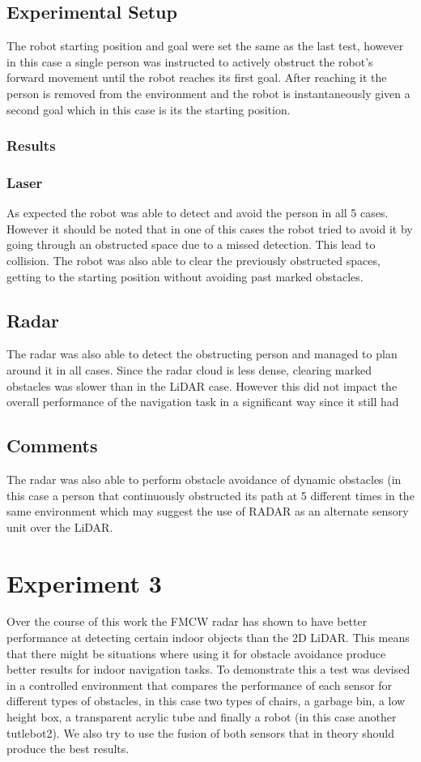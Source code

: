 \subsection{Experimental Setup}
The robot starting position and goal were set the same as the last test, however in this case a single person was instructed to actively obstruct the robot's forward movement until the robot reaches its first goal. After reaching it the person is removed from the environment  and the robot is  instantaneously given a second goal which in this case is its the starting position. 
\subsubsection{Results}
\subsubsection{Laser}
As expected the robot was able to detect and avoid the person in all 5 cases. However it should be noted that in one of this cases the robot tried to avoid it by going through an obstructed space due to a missed detection. This lead to collision. The robot was also able to clear the previously obstructed spaces, getting to the starting position without avoiding past marked obstacles.
\subsection{Radar}
The radar was also able to detect the obstructing person and managed to plan around it in all cases. Since the radar cloud is less dense, clearing marked obstacles was slower than in the \ac{LiDAR} case. However this did not impact the overall performance of the navigation task in a significant way since it still had 
\subsection{Comments}
 The radar was also able to perform 
obstacle avoidance of dynamic obstacles (in this case a person that continuously obstructed its path at 5 different times in the same environment which may suggest the use of \ac{RADAR} as an alternate sensory unit over the \ac{LiDAR}.
\section {Experiment 3}
Over the course of this work the \ac{FMCW} radar has shown to have better performance at detecting certain indoor objects than the 2D \ac{LiDAR}. This means that there might be situations where using it for obstacle avoidance produce better results for indoor navigation tasks. To demonstrate this a test was devised in a controlled environment that compares the performance of each sensor for different types of obstacles, in this case two types of chairs, a garbage bin, a low height box, a transparent acrylic tube and finally a robot (in this case another tutlebot2).  We also try to use the fusion of both sensors that in theory should produce the best results.


